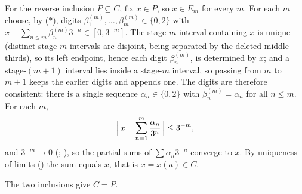 \documentclass[main.tex]{subfiles}
\begin{document}
\begin{SolutionBlue}
For the reverse inclusion $P\subseteq C$, fix $x\in P$, so $x\in E_{m}$ for every $m$. For each $m$ choose, by ($\ast$),
digits $\beta_{1}^{(m)},\dots,\beta_{m}^{(m)}\in\{0,2\}$ with
$x-\sum_{n\le m}\beta_{n}^{(m)}3^{-n}\in[0,3^{-m}]$. The stage-$m$ interval containing $x$ is unique
(distinct stage-$m$ intervals are disjoint, being separated by the deleted middle thirds), so its left
endpoint, hence each digit $\beta_{n}^{(m)}$, is determined by $x$; and a stage-$(m+1)$ interval lies
inside a stage-$m$ interval, so passing from $m$ to $m+1$ keeps the earlier digits and appends one. The
digits are therefore consistent: there is a single sequence $\alpha_{n}\in\{0,2\}$ with
$\beta_{n}^{(m)}=\alpha_{n}$ for all $n\le m$. For each $m$,
\[
\Bigl|\,x-\sum_{n=1}^{m}\frac{\alpha_{n}}{3^{n}}\,\Bigr|\le 3^{-m},
\]
and $3^{-m}\to 0$ (; ), so the partial sums of
$\sum\alpha_{n}3^{-n}$ converge to $x$. By uniqueness of limits () the sum equals $x$, that is $x=x(a)\in C$.

The two inclusions give $C=P$.
\end{SolutionBlue}
\end{document}
